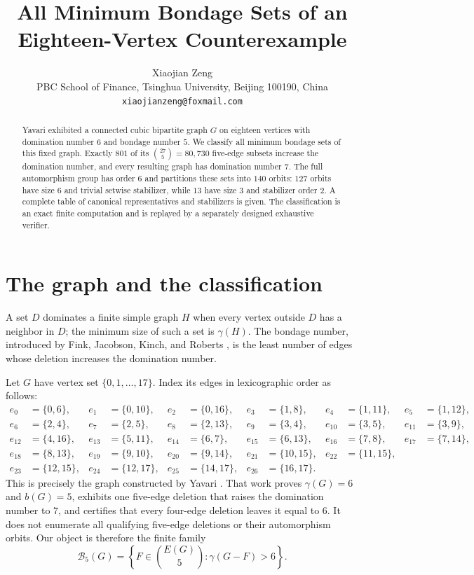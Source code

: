 \documentclass[10pt]{article}
\title{All Minimum Bondage Sets of an Eighteen-Vertex Counterexample}
\author{Xiaojian Zeng\\
PBC School of Finance, Tsinghua University, Beijing 100190, China\\
\texttt{xiaojianzeng@foxmail.com}}
\date{}
\newcommand{\Bfive}{\mathcal B_5(G)}
\begin{document}
\maketitle

\begin{abstract}
Yavari exhibited a connected cubic bipartite graph $G$ on eighteen
vertices with domination number $6$ and bondage number $5$.  We classify all
minimum bondage sets of this fixed graph.  Exactly $801$ of its
$\binom{27}{5}=80{,}730$ five-edge subsets increase the domination number, and
every resulting graph has domination number $7$.  The full automorphism group
has order $6$ and partitions these sets into $140$ orbits: $127$ orbits have
size $6$ and trivial setwise stabilizer, while $13$ have size $3$ and
stabilizer order $2$.  A complete table of canonical representatives and
stabilizers is given.  The classification is an exact finite computation and
is replayed by a separately designed exhaustive verifier.
\end{abstract}

\section{The graph and the classification}

A set $D$ dominates a finite simple graph $H$ when every vertex outside $D$
has a neighbor in $D$; the minimum size of such a set is $\gamma(H)$.  The
bondage number, introduced by Fink, Jacobson, Kinch, and Roberts
\cite{FinkEtAl1990}, is the least number of edges whose deletion increases the
domination number.

Let $G$ have vertex set $\{0,1,\ldots,17\}$.  Index its edges in
lexicographic order as follows:
\begin{equation}
\begin{aligned}
e_0&=\{0,6\},&e_1&=\{0,10\},&e_2&=\{0,16\},&e_3&=\{1,8\},
 &e_4&=\{1,11\},&e_5&=\{1,12\},\\
e_6&=\{2,4\},&e_7&=\{2,5\},&e_8&=\{2,13\},&e_9&=\{3,4\},
 &e_{10}&=\{3,5\},&e_{11}&=\{3,9\},\\
e_{12}&=\{4,16\},&e_{13}&=\{5,11\},&e_{14}&=\{6,7\},
 &e_{15}&=\{6,13\},&e_{16}&=\{7,8\},&e_{17}&=\{7,14\},\\
e_{18}&=\{8,13\},&e_{19}&=\{9,10\},&e_{20}&=\{9,14\},
 &e_{21}&=\{10,15\},&e_{22}&=\{11,15\},\\
e_{23}&=\{12,15\},&e_{24}&=\{12,17\},&e_{25}&=\{14,17\},
 &e_{26}&=\{16,17\}.
\end{aligned}
\tag{1}\label{eq:edges}
\end{equation}
This is precisely the graph constructed by Yavari \cite{Yavari2026}.  That
work proves $\gamma(G)=6$ and
$b(G)=5$, exhibits one five-edge deletion that raises the domination number to
$7$, and certifies that every four-edge deletion leaves it equal to $6$.
It does not enumerate all qualifying five-edge deletions or their automorphism
orbits.  Our object is therefore the finite family
\[
 \Bfive=\left\{F\in\binom{E(G)}5:\gamma(G-F)>6\right\}.
\]
\end{document}
